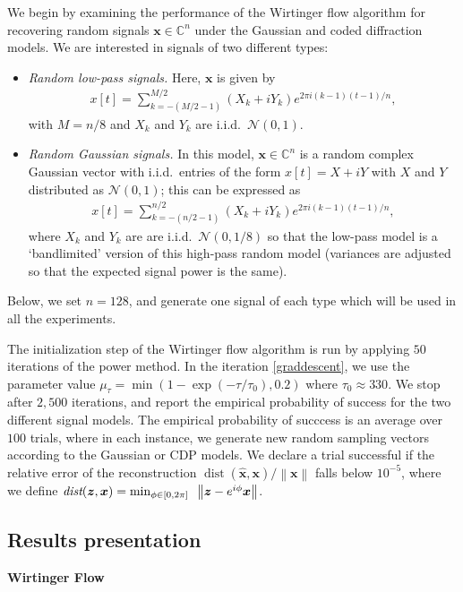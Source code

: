 \documentclass[conference,onecolumn,12pt]{IEEEtran}
\newcommand{\twonorm}[1]{\left\|#1\right\|}
\newcommand{\x}{\vct{x}}
\newcommand{\C}{\mathbb{C}}
\newcommand{\<}{\langle}
\renewcommand{\>}{\rangle}
\newcommand{\vct}[1]{\bm{#1}}
\numberwithin{equation}{section}
\begin{document}
We begin by examining the performance of the Wirtinger flow algorithm for
recovering random signals $\vct{x}\in\C^n$ under the Gaussian and
coded diffraction models. We are interested in signals of two
different types:
\begin{itemize}
\item \emph{Random low-pass signals.} Here, $\x$ is given by 
  \begin{align*} {x}[t]=\sum_{k=-(M/2-1)}^{M/2} (X_k+iY_k) e^{2\pi i
      (k-1)(t-1)/n},
\end{align*}
with $M = n/8$ and $X_k$ and $Y_k$ are i.i.d.~$\mathcal{N}(0,1)$.
\item \emph{Random Gaussian signals.} In this model, $\x \in \C^n$ is
  a random complex Gaussian vector with i.i.d.~entries of the form
  $x[t] = X+iY$ with $X$ and $Y$ distributed as $\mathcal{N}(0,1)$;
  this can be expressed as
  \begin{align*} {x}[t]=\sum_{k=-(n/2-1)}^{n/2} (X_k+iY_k) e^{2\pi i
      (k-1)(t-1)/n},
\end{align*}
where $X_k$ and $Y_k$ are are i.i.d.~$\mathcal{N}(0,1/8)$ so that the
low-pass model is a `bandlimited' version of this high-pass random
model (variances are adjusted so that the expected signal power is the
same).
\end{itemize}
Below, we set $n=128$, and generate one signal of each type which will
be used in all the experiments.

The initialization step of the Wirtinger flow algorithm is run by applying $50$
iterations of the power method. In the iteration \eqref{graddescent}, we use the
parameter value $\mu_\tau=\min(1-\exp(-\tau/\tau_0),0.2)$ where
$\tau_0 \approx 330$. We stop after $2,500$ iterations, and report the
empirical probability of success for the two different signal
models. The empirical probability of succcess is an average over $100$
trials, where in each instance, we generate new random sampling
vectors according to the Gaussian or CDP models. We declare a trial
successful if the relative error of the reconstruction
$\operatorname{dist}(\hat{\vct{x}},\vct{x})/\twonorm{\vct{x}}$ falls
below $10^{-5}$, where we define $\emph{dist}(\vct{z},\vct{x}) = \min_{\phi\in[0,2\pi]}
\,\,\, \twonorm{\vct{z}-e^{i\phi}\vct{x}}$.

\subsection{Results presentation}
{\bf Wirtinger Flow}
\end{document}
